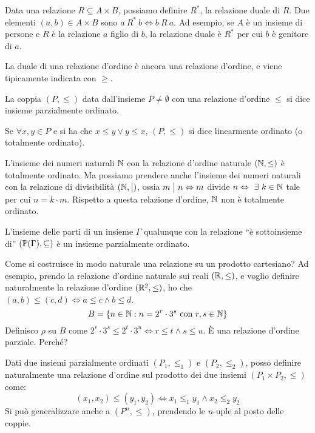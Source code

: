 Data una relazione $R \subseteq A \times B$, possiamo definire $R^{\ast}$, la relazione duale di $R$. Due elementi $(a,b) \in A \times B$ sono $a \ R^{\ast} \ b \iff b \ R \ a$. Ad esempio, se $A$ \`e un insieme di persone e $R$ \`e la relazione $ a $ figlio di $b$, la relazione duale \`e $R^{\ast}$ per cui $ b $ \`e genitore di $a$.

La duale di una relazione d'ordine \`e ancora una relazione d'ordine, e viene tipicamente indicata con $\geq$.

La coppia $(P, \le)$ data dall'insieme $P \neq \emptyset$ con una relazione d'ordine $\le$ si dice insieme parzialmente ordinato.

\begin{defn}
Se $\forall x, y \in P$ e si ha che $x \leq y \lor y \leq x$, $(P, \leq)$ si dice linearmente ordinato (o totalmente ordinato).
\end{defn}

L'insieme dei numeri naturali $\mathbb{N}$ con la relazione d'ordine naturale $(\mathbb{N}, \leq)$ \`e totalmente ordinato. Ma possiamo prendere anche l'insieme dei numeri naturali con la relazione di divisibilit\`a $(\mathbb{N}, \bigm|)$, ossia $m \bigm| n \Leftrightarrow m $ divide $ n \iff \exists k \in \naturals$ tale per cui $n = k \cdot m$. Rispetto a questa relazione d'ordine, $\mathbb{N}$ non \`e totalmente ordinato.

L'insieme delle parti di un insieme $\Gamma$ qualunque con la relazione ``\`e sottoinsieme di'' $\left(\mathbb{P}(\Gamma), \subseteq \right)$ \`e un insieme parzialmente ordinato. 

Come si costruisce in modo naturale una relazione su un prodotto cartesiano? Ad esempio, prendo la relazione d'ordine naturale sui reali $(\mathbb{R}, \leq)$, e voglio definire naturalmente la relazione d'ordine $(\mathbb{R}^2, \leq)$, ho che $(a,b) \leq (c,d) \iff a \leq c \land b \leq d$.
\[
B = \{ n \in \mathbb{N} : n = 2^r \cdot 3^s \text{ con } r, s \in \mathbb{N}\}
\]
Definisco $\rho$ su $B$ come $2^r \cdot 3^s \leq 2^t \cdot 3^u \iff r \leq t \land s \leq u$. \`E una relazione d'ordine parziale. Perch\'e?
\vspace{3cm}

\begin{defn}
Dati due insiemi parzialmente ordinati $(P_1, \le_1)$ e $(P_2, \le_2)$, posso definire naturalmente una relazione d'ordine sul prodotto dei due insiemi $(P_1 \times P_2, \le)$ come:
\[
(x_1, x_2) \le (y_1, y_2) \iff x_1 \le_1 y_1 \land x_2 \le_2 y_2
\]
Si pu\`o generalizzare anche a $(P^n, \le)$, prendendo le $n$-uple al posto delle coppie.
\end{defn}

